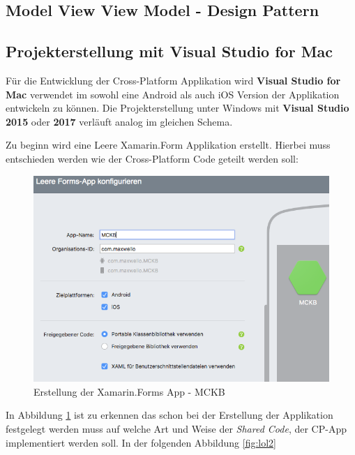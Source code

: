 \subsection{Model View View Model - Design Pattern}
\label{sec:xamarinformsmvvm}

\newpage
\subsection{Projekterstellung mit Visual Studio for Mac}
\label{sec:xamarincreateproject}

	Für die Entwicklung der Cross-Platform Applikation wird \textbf{Visual Studio for Mac} verwendet im sowohl eine Android als auch iOS Version der Applikation entwickeln zu können. Die Projekterstellung unter Windows mit \textbf{Visual Studio 2015} oder \textbf{2017} verläuft analog im gleichen Schema.

	Zu beginn wird eine Leere Xamarin.Form Applikation erstellt. Hierbei muss entschieden werden wie der Cross-Platform Code geteilt werden soll:

	\begin{figure}[h!]
		\centering
		\includegraphics[width=1\textwidth]{images/Project-Setup-one.png}
		\caption{Erstellung der Xamarin.Forms App - MCKB}
		\label{fig:lol}
	\end{figure}

	In Abbildung \ref{fig:lol} ist zu erkennen das schon bei der Erstellung der Applikation festgelegt werden muss auf welche Art und Weise der \textit{Shared Code}, der CP-App implementiert werden soll. In der folgenden Abbildung \ref{fig:lol2}

